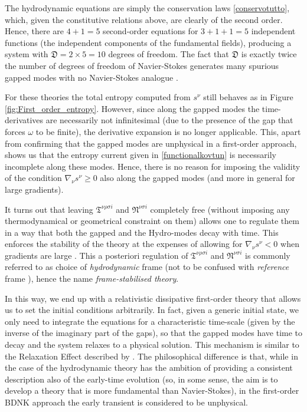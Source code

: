 \documentclass[a4paper, amsfonts, amssymb, amsmath, reprint, twocolumn, showkeys, nofootinbib]{revtex4-2}
\begin{document}
The hydrodynamic equations are simply the conservation laws \eqref{conservotutto}, which, given the constitutive relations above, are clearly of the second order. Hence, there are $4+1=5$ second-order equations for $3+1+1=5$ independent functions (the independent components of the fundamental fields), producing a system with
$\mathfrak{D}=2\times 5=10$ degrees of freedom. The fact that $\mathfrak{D}$ is exactly twice the number of degrees of freedom of Navier-Stokes generates many spurious gapped modes with no Navier-Stokes analogue \cite{Kovtun2019}.

For these theories the total entropy computed from $s^\nu$  still behaves as in Figure \ref{fig:First_order_entropy}. However, since along the gapped modes the time-derivatives are necessarily not infinitesimal (due to the presence of the gap that forces $\omega$ to be finite), the derivative expansion is no longer applicable. This, apart from confirming that the gapped modes are unphysical in a first-order approach, shows us that the entropy current given in \eqref{functionalkovtun} is necessarily incomplete along these modes. Hence, there is no reason for imposing the validity of the condition $\nabla_\nu s^\nu \geq 0$ also along the gapped modes (and more in general for large gradients).

It turns out that leaving $ \mathfrak{T}^{ \nu \rho \sigma i}$ and $\mathfrak{N}^{\nu  \sigma i} $ completely free (without imposing any thermodynamical or geometrical constraint on them) allows one to regulate them in a way that both the gapped and the Hydro-modes decay with time. This enforces the stability of the theory \citep{Bemfica2019_conformal1,Kovtun2019,BemficaDNDefinitivo2020} at the expenses of allowing for $\nabla_\nu s^\nu<0$ when gradients are large \citep{GavassinoLyapunov_2020,Shokri2020}. This a posteriori regulation of $ \mathfrak{T}^{ \nu \rho \sigma i}$ and $\mathfrak{N}^{\nu  \sigma i} $ is commonly referred to as choice of  \textit{hydrodynamic} frame (not to be confused with \textit{reference} frame \cite{Kovtun2019}), hence the name \textit{frame-stabilised theory}.

In this way, we end up with a relativistic dissipative first-order theory that allows us to set the initial conditions arbitrarily. In fact, given a generic initial state, we only need to integrate the equations for a characteristic time-scale (given by the inverse of the imaginary part of the gaps), so that the gapped modes have time to decay and the system relaxes to a physical solution. This mechanism is similar to the Relaxation Effect described by \citet{LindblomRelaxation1996}. 
The philosophical difference is that, while in the case of \citet{LindblomRelaxation1996} the hydrodynamic theory has the ambition of providing a consistent description also of the early-time evolution (so, in some sense, the aim is to develop a theory that is more fundamental than Navier-Stokes), in the first-order BDNK approach the early transient is considered to be unphysical.
\end{document}
